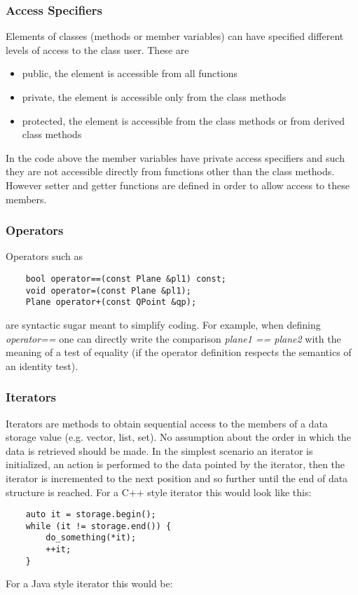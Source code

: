 \documentclass{article}
\begin{document}
\subsubsection {Access Specifiers}
Elements of classes (methods or member variables) can have specified different levels of access to the class user. These are 
\begin{itemize}
\item public, the element is accessible from all functions
\item private, the element is accessible only from the class methods
\item protected, the element is accessible from the class methods or from derived class methods
\end{itemize}  
In the code above the member variables have private access specifiers and such they are not accessible directly from functions other than the class methods. However setter and getter functions are defined in order to allow access to these members. 

\subsubsection {Operators}
Operators such as
\begin{lstlisting}
    bool operator==(const Plane &pl1) const;
    void operator=(const Plane &pl1);
    Plane operator+(const QPoint &qp);
\end{lstlisting}
are syntactic sugar meant to simplify coding. For example, when defining \textit{operator==} one can directly write the comparison \textit{ plane1 == plane2 } with the meaning of a test of equality (if the operator definition respects the semantics of an identity test). 

\subsubsection {Iterators}

Iterators are methods to obtain sequential access to the members of a data storage value (e.g. vector, list, set). No assumption about the order in which the data is retrieved should be made. In the simplest scenario an iterator is initialized, an action is performed to the data pointed by the iterator, then the iterator is incremented to the next position and so further until the end of data structure is reached. For a C++ style iterator this would look like this:

\begin{lstlisting}
	auto it = storage.begin();
	while (it != storage.end()) {
		do_something(*it);
    	++it;
	}
\end{lstlisting}

For a Java style iterator this would be:

\begin{lstlisting}
\end{lstlisting}
\end{document}
